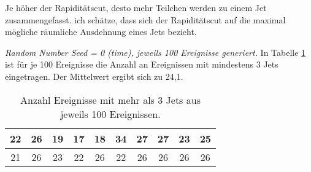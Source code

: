 \documentclass[]{scrartcl}
\begin{document}
	Je höher der Rapiditätscut, desto mehr Teilchen werden zu einem Jet zusammengefasst. ich schätze, dass sich der Rapiditätscut auf die maximal mögliche räumliche Ausdehnung eines Jets bezieht.\\
	
	\newpage
	
	\textit{Random Number Seed = 0 (time), jeweils 100 Ereignisse generiert.} In Tabelle \ref{tab:num} ist für je 100 Ereignisse die Anzahl an Ereignissen mit mindestens 3 Jets eingetragen. Der Mittelwert ergibt sich zu 24,1. \\
	
	\begin{table}[h]
		\centering
	\begin{tabular}{|c|c|c|c|c|c|c|c|c|c|}
		\hline 
		22 & 26 & 19 & 17 & 18 & 34 & 27 & 27 & 23 & 25 \\ 
		\hline 
		21 & 26 & 23 & 22 & 26 & 22 & 26 & 26 & 26 & 26 \\ 
		\hline 
	\end{tabular} 
	\caption{Anzahl Ereignisse mit mehr als 3 Jets aus jeweils 100 Ereignissen.}
	\label{tab:num}
	\end{table}
	
	
\end{document}
